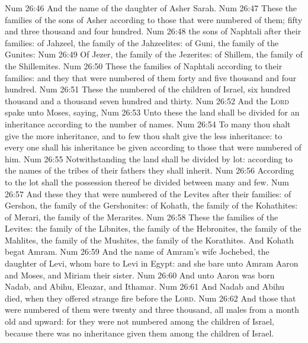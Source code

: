 \vs Num 26:46 And the name of the daughter of Asher  Sarah.
\vs Num 26:47 These  the families of the sons of Asher according to those that were numbered of them;  fifty and three thousand and four hundred.
\vs Num 26:48  the sons of Naphtali after their families: of Jahzeel, the family of the Jahzeelites: of Guni, the family of the Gunites:
\vs Num 26:49 Of Jezer, the family of the Jezerites: of Shillem, the family of the Shillemites.
\vs Num 26:50 These  the families of Naphtali according to their families: and they that were numbered of them  forty and five thousand and four hundred.
\vs Num 26:51 These  the numbered of the children of Israel, six hundred thousand and a thousand seven hundred and thirty.
\vs Num 26:52 And the \textsc{Lord} spake unto Moses, saying,
\vs Num 26:53 Unto these the land shall be divided for an inheritance according to the number of names.
\vs Num 26:54 To many thou shalt give the more inheritance, and to few thou shalt give the less inheritance: to every one shall his inheritance be given according to those that were numbered of him.
\vs Num 26:55 Notwithstanding the land shall be divided by lot: according to the names of the tribes of their fathers they shall inherit.
\vs Num 26:56 According to the lot shall the possession thereof be divided between many and few.
\vs Num 26:57 And these  they that were numbered of the Levites after their families: of Gershon, the family of the Gershonites: of Kohath, the family of the Kohathites: of Merari, the family of the Merarites.
\vs Num 26:58 These  the families of the Levites: the family of the Libnites, the family of the Hebronites, the family of the Mahlites, the family of the Mushites, the family of the Korathites. And Kohath begat Amram.
\vs Num 26:59 And the name of Amram's wife  Jochebed, the daughter of Levi, whom  bare to Levi in Egypt: and she bare unto Amram Aaron and Moses, and Miriam their sister.
\vs Num 26:60 And unto Aaron was born Nadab, and Abihu, Eleazar, and Ithamar.
\vs Num 26:61 And Nadab and Abihu died, when they offered strange fire before the \textsc{Lord}.
\vs Num 26:62 And those that were numbered of them were twenty and three thousand, all males from a month old and upward: for they were not numbered among the children of Israel, because there was no inheritance given them among the children of Israel.
